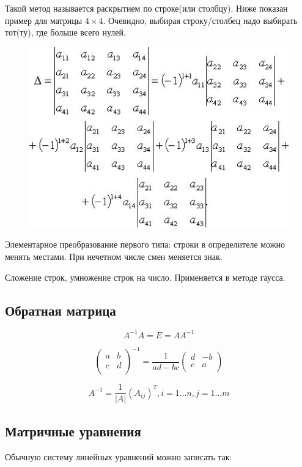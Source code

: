 \documentclass{article}
\begin{document}
Такой метод называется раскрытием по строке(или столбцу). Ниже показан пример для матрицы $4\times 4$. Очевидно, выбирая строку/столбец надо выбирать тот(ту), где больше всего нулей.
\begin{figure}[htp]
\centering
\includegraphics[scale=.600]{det-by-row.jpeg}
\end{figure}

Элементарное преобразование первого типа: строки в определителе можно менять местами. При нечетном числе смен меняется знак.

Сложение строк, умножение строк на число. Применяется в методе гаусса.

\subsection*{Обратная матрица}

$$A^{-1}A = E = AA^{-1}$$

$$\left(\begin{matrix}
	a & b\\
	c & d\\
\end{matrix}\right)^{-1} = 
\frac 1{ad-bc}\left(\begin{matrix}
	d & -b\\
	c & a\\
\end{matrix}\right)
$$

$$A^{-1} = \frac 1{|A|}(A_{ij})^T, i=1\ldots n, j=1 \ldots m$$

\subsection*{Матричные уравнения}

Обычную систему линейных уравнений можно записать так:
\end{document}
